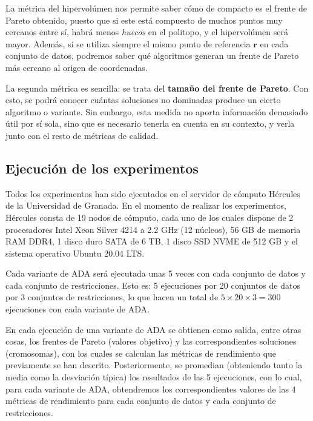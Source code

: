 La métrica del hipervolúmen nos permite saber cómo de compacto es el frente de Pareto obtenido, puesto que si este está compuesto de muchos puntos muy cercanos entre sí, habrá menos \emph{huecos} en el politopo, y el hipervolúmen será mayor. Además, si se utiliza siempre el mismo punto de referencia $\textbf{r}$ en cada conjunto de datos, podremos saber qué algoritmos generan un frente de Pareto más cercano al origen de coordenadas.

La segunda métrica es sencilla: se trata del \textbf{tamaño del frente de Pareto}. Con esto, se podrá conocer cuántas soluciones no dominadas produce un cierto algoritmo o variante. Sin embargo, esta medida no aporta información demasiado útil por sí sola, sino que es necesario tenerla en cuenta en su contexto, y verla junto con el resto de métricas de calidad.


\subsection{Ejecución de los experimentos}

Todos los experimentos han sido ejecutados en el servidor de cómputo Hércules de la Universidad de Granada. En el momento de realizar los experimentos, Hércules consta de 19 nodos de cómputo, cada uno de los cuales dispone de 2 procesadores Intel Xeon Silver 4214 a 2.2 GHz (12 núcleos), 56 GB de memoria RAM DDR4, 1 disco duro SATA de 6 TB, 1 disco SSD NVME de 512 GB y el sistema operativo Ubuntu 20.04 LTS.

Cada variante de ADA será ejecutada unas 5 veces con cada conjunto de datos y cada conjunto de restricciones. Esto es: 5 ejecuciones por 20 conjuntos de datos por 3 conjuntos de restricciones, lo que hacen un total de $5 \times 20 \times 3 = 300$ ejecuciones con cada variante de ADA.

En cada ejecución de una variante de ADA se obtienen como salida, entre otras cosas, los frentes de Pareto (valores objetivo) y las correspondientes soluciones (cromosomas), con los cuales se calculan las métricas de rendimiento que previamente se han descrito. Posteriormente, se promedian (obteniendo tanto la media como la desviación típica) los resultados de las 5 ejecuciones, con lo cual, para cada variante de ADA, obtendremos los correspondientes valores de las 4 métricas de rendimiento para cada conjunto de datos y cada conjunto de restricciones.








